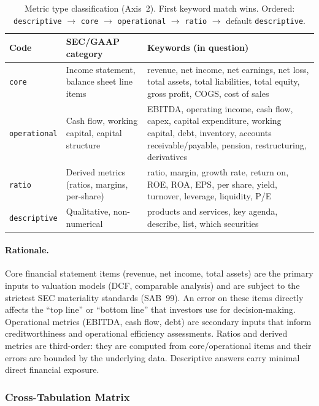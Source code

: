 \begin{table}[h]
\centering
\footnotesize
\begin{tabular}{@{}lp{4.5cm}p{8cm}@{}}
\toprule
Code & SEC/GAAP category & Keywords (in question) \\
\midrule
\texttt{core}
  & Income statement, balance sheet line items
  & revenue, net income, net earnings, net loss, total assets, total
    liabilities, total equity, gross profit, COGS, cost of sales \\
\texttt{operational}
  & Cash flow, working capital, capital structure
  & EBITDA, operating income, cash flow, capex, capital expenditure,
    working capital, debt, inventory, accounts receivable/payable,
    pension, restructuring, derivatives \\
\texttt{ratio}
  & Derived metrics (ratios, margins, per-share)
  & ratio, margin, growth rate, return on, ROE, ROA, EPS, per share,
    yield, turnover, leverage, liquidity, P/E \\
\texttt{descriptive}
  & Qualitative, non-numerical
  & products and services, key agenda, describe, list, which securities \\
\bottomrule
\end{tabular}
\caption{Metric type classification (Axis~2). First keyword match wins.
Ordered: \texttt{descriptive} $\to$ \texttt{core} $\to$
\texttt{operational} $\to$ \texttt{ratio} $\to$ default
\texttt{descriptive}.}
\label{tab:metric-types}
\end{table}

\paragraph{Rationale.}
Core financial statement items (revenue, net income, total assets) are
the primary inputs to valuation models (DCF, comparable analysis) and
are subject to the strictest SEC materiality standards (SAB~99). An
error on these items directly affects the \enquote{top line} or \enquote{bottom line}
that investors use for decision-making. Operational metrics (EBITDA,
cash flow, debt) are secondary inputs that inform creditworthiness and
operational efficiency assessments. Ratios and derived metrics are
third-order: they are computed from core/operational items and their
errors are bounded by the underlying data. Descriptive answers carry
minimal direct financial exposure.

\subsubsection{Cross-Tabulation Matrix}
\label{sec:severity-matrix}

